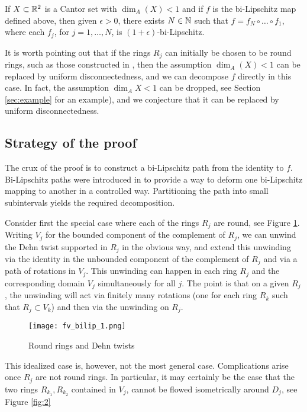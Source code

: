 \documentclass{amsart}
\begin{document}
\begin{theorem}
\label{thm:main1}
If $X \subset \mathbb{R}^2$ is a Cantor set with $\dim_A(X) <1$ and if $f$ is the bi-Lipschitz map defined above, then given $\epsilon >0$, there exists $N\in \mathbb{N}$ such that $f = f_N\circ \ldots \circ f_1$, where each $f_j$, for $j=1,\ldots, N$, is $(1+\epsilon)$-bi-Lipschitz.
\end{theorem}

It is worth pointing out that if the rings $R_j$ can initially be chosen to be round rings, such as those constructed in \cite{AIPS}, then the assumption $\dim_A(X)<1$ can be replaced by uniform disconnectedness, and we can decompose $f$ directly in this case. In fact, the assumption $\dim_A{X}<1$ can be dropped, see Section \ref{sec:example} for an example), and we conjecture that it can be replaced by uniform disconnectedness.

\subsection{Strategy of the proof}

The crux of the proof is to construct a bi-Lipschitz path from the identity to $f$. Bi-Lipschitz paths were introduced in \cite{FM} to provide a way to deform one bi-Lipschitz mapping to another in a controlled way. Partitioning the path into small subintervals yields the required decomposition.

Consider first the special case where each of the rings $R_j$ are round, see Figure \ref{fig:1}. Writing $V_j$ for the bounded component of the complement of $R_j$, we can unwind the Dehn twist supported in $R_j$ in the obvious way, and extend this unwinding via the identity in the unbounded component of the complement of $R_j$ and via a path of rotations in $V_j$. This unwinding can happen in each ring $R_j$ and the corresponding domain $V_j$ simultaneously for all $j$. The point is that on a given $R_j$, the unwinding will act via finitely many rotations (one for each ring $R_k$ such that $R_j \subset V_k$) and then via the unwinding on $R_j$.

\begin{figure}[h]
\begin{center}
\texttt{[image: fv\_bilip\_1.png]}
\caption{Round rings and Dehn twists}
\label{fig:1}
\end{center}
\end{figure}

This idealized case is, however, not the most general case. Complications arise once $R_j$ are not round rings. In particular, it may certainly be the case that the two rings $R_{k_1},R_{k_2}$ contained in $V_j$, cannot be flowed isometrically around $D_j$, see Figure \ref{fig:2}
\end{document}

